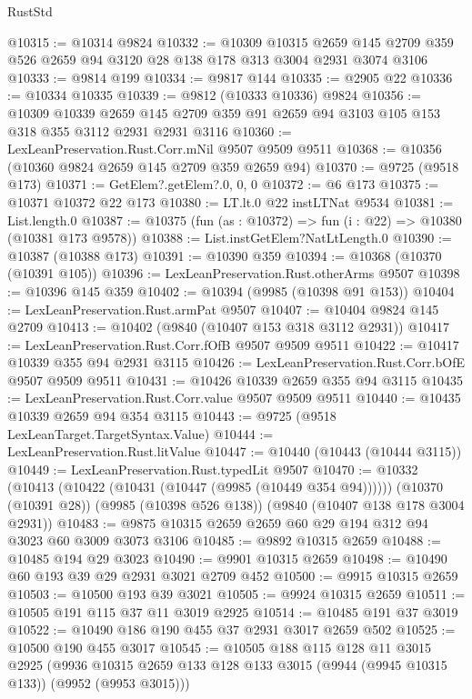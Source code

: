 \begin{lexlean}{RustStd}
\begin{coremodule}
@10315 := @10314 @9824
@10332 := @10309
    @10315
    @2659
    @145
    @2709
    @359
    @526
    @2659
    @94
    @3120
    @28
    @138
    @178
    @313
    @3004
    @2931
    @3074
    @3106
@10333 := @9814 @199
@10334 := @9817 @144
@10335 := @2905 @22
@10336 := @10334 @10335
@10339 := @9812 (@10333 @10336) @9824
@10356 := @10309
    @10339
    @2659
    @145
    @2709
    @359
    @91
    @2659
    @94
    @3103
    @105
    @153
    @318
    @355
    @3112
    @2931
    @2931
    @3116
@10360 := LexLeanPreservation.Rust.Corr.mNil @9507 @9509 @9511
@10368 := @10356 (@10360 @9824 @2659 @145 @2709 @359 @2659 @94)
@10370 := @9725 (@9518 @173)
@10371 := GetElem?.getElem?.{0, 0, 0}
@10372 := @6 @173
@10375 := @10371 @10372 @22 @173
@10380 := LT.lt.{0} @22 instLTNat @9534
@10381 := List.length.{0}
@10387 := @10375 (fun (as : @10372) => fun (i : @22) => @10380 (@10381 @173 @9578))
@10388 := List.instGetElem?NatLtLength.{0}
@10390 := @10387 (@10388 @173)
@10391 := @10390 @359
@10394 := @10368 (@10370 (@10391 @105))
@10396 := LexLeanPreservation.Rust.otherArms @9507
@10398 := @10396 @145 @359
@10402 := @10394 (@9985 (@10398 @91 @153))
@10404 := LexLeanPreservation.Rust.armPat @9507
@10407 := @10404 @9824 @145 @2709
@10413 := @10402 (@9840 (@10407 @153 @318 @3112 @2931))
@10417 := LexLeanPreservation.Rust.Corr.fOfB @9507 @9509 @9511
@10422 := @10417 @10339 @355 @94 @2931 @3115
@10426 := LexLeanPreservation.Rust.Corr.bOfE @9507 @9509 @9511
@10431 := @10426 @10339 @2659 @355 @94 @3115
@10435 := LexLeanPreservation.Rust.Corr.value @9507 @9509 @9511
@10440 := @10435 @10339 @2659 @94 @354 @3115
@10443 := @9725 (@9518 LexLeanTarget.TargetSyntax.Value)
@10444 := LexLeanPreservation.Rust.litValue
@10447 := @10440 (@10443 (@10444 @3115))
@10449 := LexLeanPreservation.Rust.typedLit @9507
@10470 := @10332
    (@10413 (@10422 (@10431 (@10447 (@9985 (@10449 @354 @94))))))
    (@10370 (@10391 @28))
    (@9985 (@10398 @526 @138))
    (@9840 (@10407 @138 @178 @3004 @2931))
@10483 := @9875 @10315 @2659 @2659 @60 @29 @194 @312 @94 @3023 @60 @3009 @3073 @3106
@10485 := @9892 @10315 @2659
@10488 := @10485 @194 @29 @3023
@10490 := @9901 @10315 @2659
@10498 := @10490 @60 @193 @39 @29 @2931 @3021 @2709 @452
@10500 := @9915 @10315 @2659
@10503 := @10500 @193 @39 @3021
@10505 := @9924 @10315 @2659
@10511 := @10505 @191 @115 @37 @11 @3019 @2925
@10514 := @10485 @191 @37 @3019
@10522 := @10490 @186 @190 @455 @37 @2931 @3017 @2659 @502
@10525 := @10500 @190 @455 @3017
@10545 := @10505
    @188
    @115
    @128
    @11
    @3015
    @2925
    (@9936 @10315 @2659 @133 @128 @133 @3015 (@9944 (@9945 @10315 @133)) (@9952 (@9953 @3015)))

\end{coremodule}
\end{lexlean}
